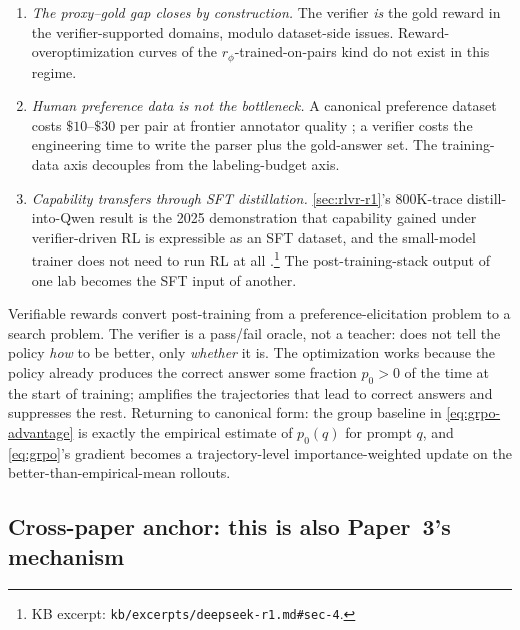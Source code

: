 \begin{enumerate}
\item \emph{The proxy--gold gap closes by construction.} The verifier
\emph{is} the gold reward in the verifier-supported domains, modulo
dataset-side issues. Reward-overoptimization curves of the
$r_\phi$-trained-on-pairs kind do not exist in this regime.
\item \emph{Human preference data is not the bottleneck.} A canonical
preference dataset costs $\$10$--$\$30$ per pair at frontier annotator
quality \citep[\S 3.4]{ouyang2022-instructgpt}; a verifier costs the
engineering time to write the parser plus the gold-answer set. The
training-data axis decouples from the labeling-budget axis.
\item \emph{Capability transfers through SFT distillation.}
\cref{sec:rlvr-r1}'s 800K-trace distill-into-Qwen result is the
2025 demonstration that capability gained under verifier-driven RL is
expressible as an SFT dataset, and the small-model trainer does not
need to run RL at all
\citep[\S 4]{deepseek-r1}.\footnote{KB excerpt:
\texttt{kb/excerpts/deepseek-r1.md\#sec-4}.} The post-training-stack
output of one lab becomes the SFT input of another.
\end{enumerate}

\begin{intuition}
Verifiable rewards convert post-training from a preference-elicitation
problem to a search problem. The verifier is a pass/fail oracle, not a
teacher:  does not tell the policy \emph{how} to be better, only
\emph{whether} it is. The optimization works because the policy already
produces the correct answer some fraction $p_0 > 0$ of the time at the
start of training;  amplifies the trajectories that lead to correct
answers and suppresses the rest. Returning to canonical form: the group
baseline in \cref{eq:grpo-advantage} is exactly the empirical estimate
of $p_0(q)$ for prompt $q$, and \cref{eq:grpo}'s gradient becomes a
trajectory-level importance-weighted update on the
better-than-empirical-mean rollouts.
\end{intuition}

\subsection{Cross-paper anchor: this is also Paper~3's mechanism}
\label{sec:rlvr-paper3-link}

